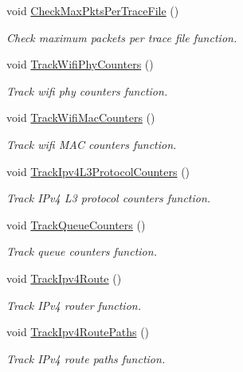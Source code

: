 \begin{DoxyCompactItemize}
\item 
void \hyperlink{classns3_1_1AnimationInterface_a99838e0ce8e0f7d8c81b44e6e4efdab0}{Check\+Max\+Pkts\+Per\+Trace\+File} ()
\begin{DoxyCompactList}\small\item\em Check maximum packets per trace file function. \end{DoxyCompactList}\item 
void \hyperlink{classns3_1_1AnimationInterface_a5305dd33917a4c394b1c44ab5ae41bc9}{Track\+Wifi\+Phy\+Counters} ()
\begin{DoxyCompactList}\small\item\em Track wifi phy counters function. \end{DoxyCompactList}\item 
void \hyperlink{classns3_1_1AnimationInterface_ad9f148d5ae0c5e95fdafe3f853f7d585}{Track\+Wifi\+Mac\+Counters} ()
\begin{DoxyCompactList}\small\item\em Track wifi M\+AC counters function. \end{DoxyCompactList}\item 
void \hyperlink{classns3_1_1AnimationInterface_aec7103d50811eae3919df131fa2afab2}{Track\+Ipv4\+L3\+Protocol\+Counters} ()
\begin{DoxyCompactList}\small\item\em Track I\+Pv4 L3 protocol counters function. \end{DoxyCompactList}\item 
void \hyperlink{classns3_1_1AnimationInterface_a0a01b75b4ad3aa055bf877a4c0cf8262}{Track\+Queue\+Counters} ()
\begin{DoxyCompactList}\small\item\em Track queue counters function. \end{DoxyCompactList}\item 
void \hyperlink{classns3_1_1AnimationInterface_a9af10e9e963b8bcd3eae43d63025dac0}{Track\+Ipv4\+Route} ()
\begin{DoxyCompactList}\small\item\em Track I\+Pv4 router function. \end{DoxyCompactList}\item 
void \hyperlink{classns3_1_1AnimationInterface_a567537be97db5e22db679bf5d4a2c242}{Track\+Ipv4\+Route\+Paths} ()
\begin{DoxyCompactList}\small\item\em Track I\+Pv4 route paths function. \end{DoxyCompactList}\item 

\end{DoxyCompactItemize}
